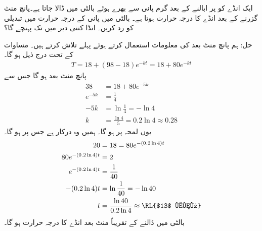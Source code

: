 ایک انڈے کو  پر ابالنے کے بعد   گرم پانی سے بھرے ہوئے بالٹی میں ڈالا جاتا ہے۔پانچ منٹ گزرنے کے بعد انڈے کا درجہ حرارت  ہوتا ہے۔ بالٹی میں پانی کے درجہ حرارت میں تبدیلی کو رد کریں۔ انڈا کتنی دیر میں  تک پہنچے گا؟

حل:\quad
ہم پانچ منٹ بعد کی معلومات استعمال کرتے ہوئے پہلے  تلاش کرتے ہیں۔ مساوات  کے تحت درج ذیل ہو گا۔
\begin{align*}
T=18+(98-18)e^{-kt}=18+80e^{-kt}
\end{align*} 
پانچ منٹ بعد  ہو گا جس سے
\begin{align*}
38&=18+80e^{-5k}\\
e^{-5k}&=\frac{1}{4}\\
-5k&=\ln\frac{1}{4}=-\ln 4\\
k&=\frac{\ln 4}{5}=0.2\ln 4\approx 0.28
\end{align*}
یوں لمحہ  پر  ہو گا۔ ہمیں وہ  درکار ہے جس پر   ہو گا۔
\begin{align*}
20&=18=80e^{-(0.2\ln 4)t}\\
80e^{-(0.2\ln 4)t}&=2\\
e^{-(0.2\ln 4)t}&=\frac{1}{40}\\
-(0.2\ln 4)t&=\ln \frac{1}{40}=-\ln 40\\
t&=\frac{\ln 40}{0.2\ln 4}\approx \text{\RL{$13$ منٹ}}
\end{align*}
بالٹی میں ڈالنے کے  تقریباً  منٹ بعد انڈے کا درجہ حرارت  ہو گا۔


